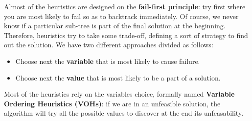 Almost of the heuristics are designed on the \textbf{fail-first principle}: try first where you are most likely to fail so as to backtrack immediately. Of course,
we never know if a particular sub-tree is part of the final solution at the beginning. Therefore, heuristics try to take some trade-off, defining a sort of 
strategy to find out the solution. We have two different approaches divided as follows:
\begin{itemize}
    \renewcommand{\labelitemi}{-}
    \item Choose next the \textbf{variable} that is most likely to cause failure.
    \item Choose next the \textbf{value} that is most likely to be a part of a solution.
\end{itemize}  
Most of the heuristics rely on the variables choice, formally named \textbf{Variable Ordering Heuristics (VOHs)}: if we are in an unfeasible solution, the algorithm
will try all the possible values to discover at the end its unfeasability.